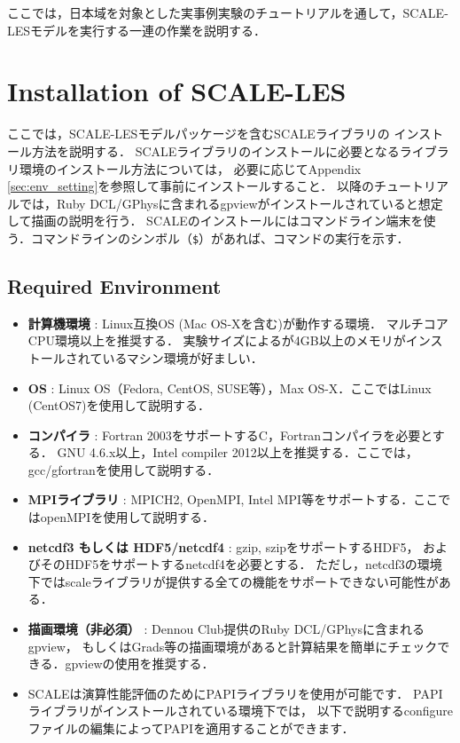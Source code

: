 ここでは，日本域を対象とした実事例実験のチュートリアルを通して，SCALE-LESモデルを実行する一連の作業を説明する．


\section{Installation of SCALE-LES}

ここでは，SCALE-LESモデルパッケージを含むSCALEライブラリの
インストール方法を説明する．
SCALEライブラリのインストールに必要となるライブラリ環境のインストール方法については，
必要に応じてAppendix \ref{sec:env_setting}を参照して事前にインストールすること．
以降のチュートリアルでは，Ruby DCL/GPhysに含まれるgpviewがインストールされていると想定して描画の説明を行う．
SCALEのインストールにはコマンドライン端末を使う．コマンドラインのシンボル（\verb|$|）があれば、コマンドの実行を示す．


\subsection{Required Environment}

\begin{itemize}
  \item {\bf 計算機環境} : Linux互換OS (Mac OS-Xを含む)が動作する環境．
        マルチコアCPU環境以上を推奨する．
        実験サイズによるが4GB以上のメモリがインストールされているマシン環境が好ましい．
  \item {\bf OS} : Linux OS（Fedora, CentOS, SUSE等），Max OS-X．ここではLinux (CentOS7)を使用して説明する．
  \item {\bf コンパイラ} : Fortran 2003をサポートするC，Fortranコンパイラを必要とする．
        GNU 4.6.x以上，Intel compiler 2012以上を推奨する．ここでは，gcc/gfortranを使用して説明する．
  \item {\bf MPIライブラリ} : MPICH2, OpenMPI, Intel MPI等をサポートする．ここではopenMPIを使用して説明する．
  \item {\bf netcdf3 もしくは HDF5/netcdf4} : gzip, szipをサポートするHDF5，
        およびそのHDF5をサポートするnetcdf4を必要とする．
        ただし，netcdf3の環境下ではscaleライブラリが提供する全ての機能をサポートできない可能性がある．
  \item {\bf 描画環境（非必須）} : Dennou Club提供のRuby DCL/GPhysに含まれるgpview，
        もしくはGrads等の描画環境があると計算結果を簡単にチェックできる．gpviewの使用を推奨する．
  \item SCALEは演算性能評価のためにPAPIライブラリを使用が可能です．
        PAPIライブラリがインストールされている環境下では，
        以下で説明するconfigureファイルの編集によってPAPIを適用することができます．
\end{itemize}



